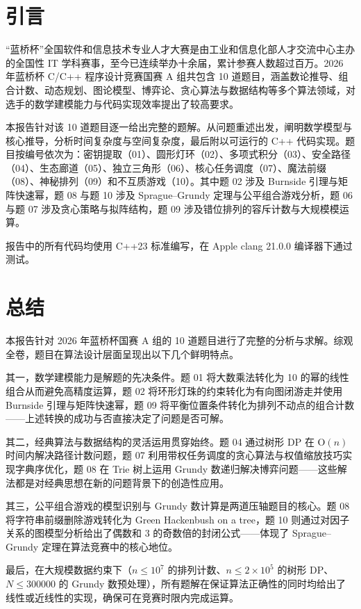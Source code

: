 \documentclass[12pt, a4paper]{academics}
\begin{document}
\makeacademicscover

\section{引言}

“蓝桥杯”全国软件和信息技术专业人才大赛是由工业和信息化部人才交流中心主办的全国性 IT 学科赛事，至今已连续举办十余届，累计参赛人数超过百万。2026 年蓝桥杯 C/C++ 程序设计竞赛国赛 A 组共包含 10 道题目，涵盖数论推导、组合计数、动态规划、图论模型、博弈论、贪心算法与数据结构等多个算法领域，对选手的数学建模能力与代码实现效率提出了较高要求。

本报告针对该 10 道题目逐一给出完整的题解。从问题重述出发，阐明数学模型与核心推导，分析时间复杂度与空间复杂度，最后附以可运行的 C++ 代码实现。题目按编号依次为：密钥提取（01）、圆形灯环（02）、多项式积分（03）、安全路径（04）、生态廊道（05）、独立三角形（06）、核心任务调度（07）、魔法前缀（08）、神秘排列（09）和不互质游戏（10）。其中题 02 涉及 Burnside 引理与矩阵快速幂，题 08 与题 10 涉及 Sprague--Grundy 定理与公平组合游戏分析，题 06 与题 07 涉及贪心策略与拟阵结构，题 09 涉及错位排列的容斥计数与大规模模运算。

报告中的所有代码均使用 C++23 标准编写，在 Apple clang 21.0.0 编译器下通过测试。












\section{总结}

本报告针对 2026 年蓝桥杯国赛 A 组的 10 道题目进行了完整的分析与求解。综观全卷，题目在算法设计层面呈现出以下几个鲜明特点。

其一，数学建模能力是解题的先决条件。题 01 将大数乘法转化为 10 的幂的线性组合从而避免高精度运算，题 02 将环形灯珠的约束转化为有向图闭游走并使用 Burnside 引理与矩阵快速幂，题 09 将平衡位置条件转化为排列不动点的组合计数——上述转换的成功与否直接决定了问题是否可解。

其二，经典算法与数据结构的灵活运用贯穿始终。题 04 通过树形 DP 在 $\mathrm{O}(n)$ 时间内解决路径计数问题，题 07 利用带权任务调度的贪心算法与权值缩放技巧实现字典序优化，题 08 在 Trie 树上运用 Grundy 数递归解决博弈问题——这些解法都是对经典思想在新的问题背景下的创造性应用。

其三，公平组合游戏的模型识别与 Grundy 数计算是两道压轴题目的核心。题 08 将字符串前缀删除游戏转化为 Green Hackenbush on a tree，题 10 则通过对因子关系的图模型分析给出了偶数和 $3$ 的奇数倍的封闭公式——体现了 Sprague--Grundy 定理在算法竞赛中的核心地位。

最后，在大规模数据约束下（$n \le 10^7$ 的排列计数、$n \le 2 \times 10^5$ 的树形 DP、$N \le 300000$ 的 Grundy 数预处理），所有题解在保证算法正确性的同时均给出了线性或近线性的实现，确保可在竞赛时限内完成运算。
\end{document}
